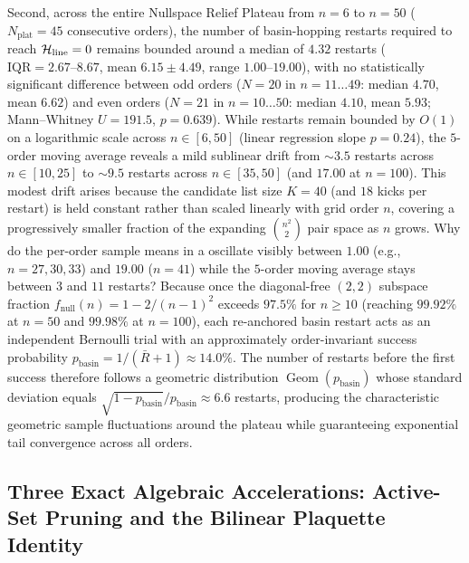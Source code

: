 Second, across the entire Nullspace Relief Plateau from $n = 6$ to $n = 50$ ($N_{\mathrm{plat}} = 45$ consecutive orders), the number of basin-hopping restarts required to reach $\mathcal{H}_{\mathrm{line}} = 0$ remains bounded around a median of $4.32$ restarts ($\text{IQR} = 2.67\text{--}8.67$, mean $6.15 \pm 4.49$, range $1.00\text{--}19.00$), with no statistically significant difference between odd orders ($N = 20$ in $n=11\dots 49$: median $4.70$, mean $6.62$) and even orders ($N = 21$ in $n=10\dots 50$: median $4.10$, mean $5.93$; Mann--Whitney $U = 191.5$, $p = 0.639$). While restarts remain bounded by $O(1)$ on a logarithmic scale across $n \in [6, 50]$ (linear regression slope $p = 0.24$), the $5$-order moving average reveals a mild sublinear drift from $\sim 3.5$ restarts across $n \in [10, 25]$ to $\sim 9.5$ restarts across $n \in [35, 50]$ (and $17.00$ at $n=100$). This modest drift arises because the candidate list size $K=40$ (and $18$ kicks per restart) is held constant rather than scaled linearly with grid order $n$, covering a progressively smaller fraction of the expanding $\binom{n^2}{2}$ pair space as $n$ grows. Why do the per-order sample means in a oscillate visibly between $1.00$ (e.g., $n = 27, 30, 33$) and $19.00$ ($n = 41$) while the $5$-order moving average stays between $3$ and $11$ restarts? Because once the diagonal-free $(2,2)$ subspace fraction $f_{\mathrm{null}}(n) = 1 - 2/(n-1)^2$ exceeds $97.5\%$ for $n \ge 10$ (reaching $99.92\%$ at $n = 50$ and $99.98\%$ at $n = 100$), each re-anchored basin restart acts as an independent Bernoulli trial with an approximately order-invariant success probability $p_{\mathrm{basin}} = 1 / (\bar{R} + 1) \approx 14.0\%$. The number of restarts before the first success therefore follows a geometric distribution $\operatorname{Geom}(p_{\mathrm{basin}})$ whose standard deviation equals $\sqrt{1-p_{\mathrm{basin}}}/p_{\mathrm{basin}} \approx 6.6$ restarts, producing the characteristic geometric sample fluctuations around the plateau while guaranteeing exponential tail convergence across all orders.

\subsection{Three Exact Algebraic Accelerations: Active-Set Pruning and the Bilinear Plaquette Identity}

